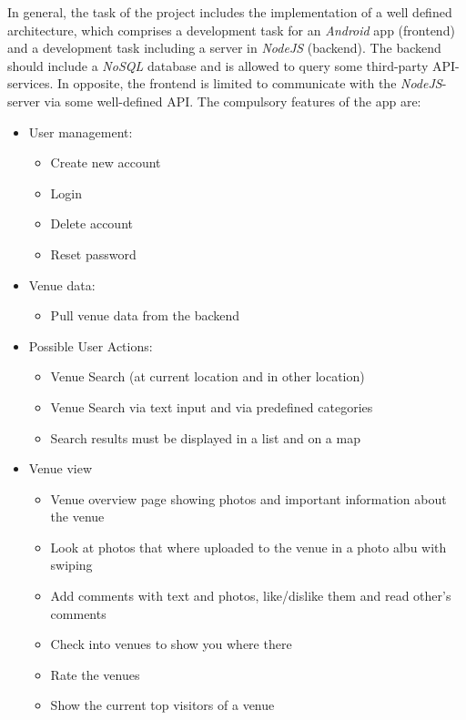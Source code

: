 In general, the task of the project includes the implementation of a well defined architecture, which comprises a development task for an \textit{Android} app (frontend) and a development task including a server in \textit{NodeJS} (backend). The backend should include a \textit{NoSQL} database and is allowed to query some third-party API-services. In opposite, the frontend is limited to communicate with the \textit{NodeJS}-server via some well-defined API. 
\newline\newline
The compulsory features of the app are:
\begin{itemize}
	\item User management:
	\begin{itemize}
		\item Create new account
		\item Login
		\item Delete account
		\item Reset password
	\end{itemize}
	\item Venue data:
	\begin{itemize}
		\item Pull venue data from the backend
	\end{itemize}
	\item Possible User Actions:
	\begin{itemize}
		\item Venue Search (at current location and in other location)
		\item Venue Search via text input and via predefined categories
		\item Search results must be displayed in a list and on a map
	\end{itemize}
	\item Venue view 
	\begin{itemize}
		\item Venue overview page showing photos and important information about the venue
		\item Look at photos that where uploaded to the venue in a photo albu with swiping
		\item Add comments with text and photos, like/dislike them and read other's comments
		\item Check into venues to show you where there
		\item Rate the venues
		\item Show the current top visitors of a venue
	\end{itemize}	

\end{itemize}
